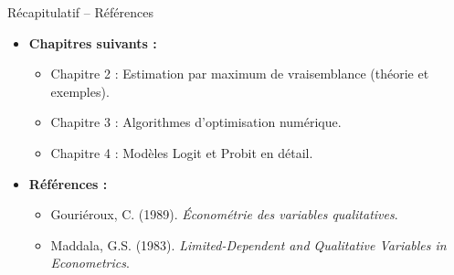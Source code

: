 \documentclass[11pt,aspectratio=169]{beamer}
\begin{document}
\begin{frame}{Récapitulatif -- Références}

\begin{itemize}

\item \textbf{Chapitres suivants :}
  \begin{itemize}
  \item Chapitre 2 : Estimation par maximum de vraisemblance (théorie et exemples).
  \item Chapitre 3 : Algorithmes d'optimisation numérique.
  \item Chapitre 4 : Modèles Logit et Probit en détail.
  \end{itemize}

\item \textbf{Références :}
  \begin{itemize}
  \item Gouriéroux, C. (1989). \textit{Économétrie des variables qualitatives}.
  \item Maddala, G.S. (1983). \textit{Limited-Dependent and Qualitative Variables in Econometrics}.
  \end{itemize}

\end{itemize}

\end{frame}
\end{document}
